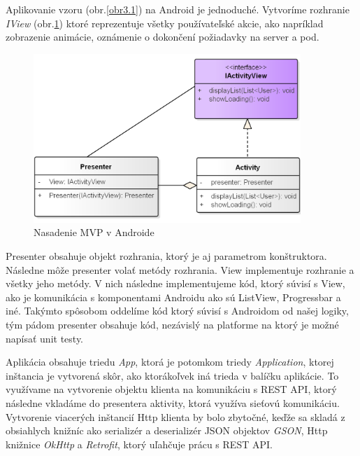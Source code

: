 Aplikovanie vzoru (obr.\ref{obr3.1}) na Android je jednoduché. Vytvoríme rozhranie \textit{IView}   (obr.\ref{obr3.2}) ktoré reprezentuje všetky používateľské akcie, ako napríklad zobrazenie animácie, oznámenie o dokončení požiadavky na server a pod.

\vspace{10pt}
\begin{figure}[H]
    \begin{center}
        \begin{minipage}{0.9\linewidth}
            \begin{center}
                \includegraphics[width=0.9\textwidth]{images/mvpandroid.png}
                \caption{Nasadenie MVP v Androide }
                \label{obr3.2}
            \end{center}
        \end{minipage}
    \end{center}
\end{figure}
\vspace{10pt}

Presenter obsahuje objekt rozhrania, ktorý je aj parametrom konštruktora. Následne môže presenter volať metódy rozhrania. View implementuje rozhranie a všetky jeho metódy. V nich následne implementujeme kód, ktorý súvisí s View, ako je komunikácia s komponentami Androidu ako sú ListView, Progressbar a iné. Takýmto spôsobom oddelíme kód ktorý súvisí s Androidom od našej logiky, tým pádom presenter obsahuje kód, nezávislý na platforme na ktorý je možné napísať unit testy.

Aplikácia obsahuje triedu \textit{App}, ktorá je potomkom triedy \textit{Application}, ktorej inštancia je vytvorená skôr, ako ktorákoľvek iná trieda v balíčku aplikácie. To využívame na vytvorenie objektu klienta na komunikáciu s REST API, ktorý následne vkladáme do presentera aktivity, ktorá využíva sieťovú komunikáciu. Vytvorenie viacerých inštancií Http klienta by bolo zbytočné, keďže sa skladá z obsiahlych knižníc ako serializér a deserializér JSON objektov \textit{GSON}, Http knižnice \textit{OkHttp} a \textit{Retrofit}, ktorý uľahčuje prácu s REST API.

